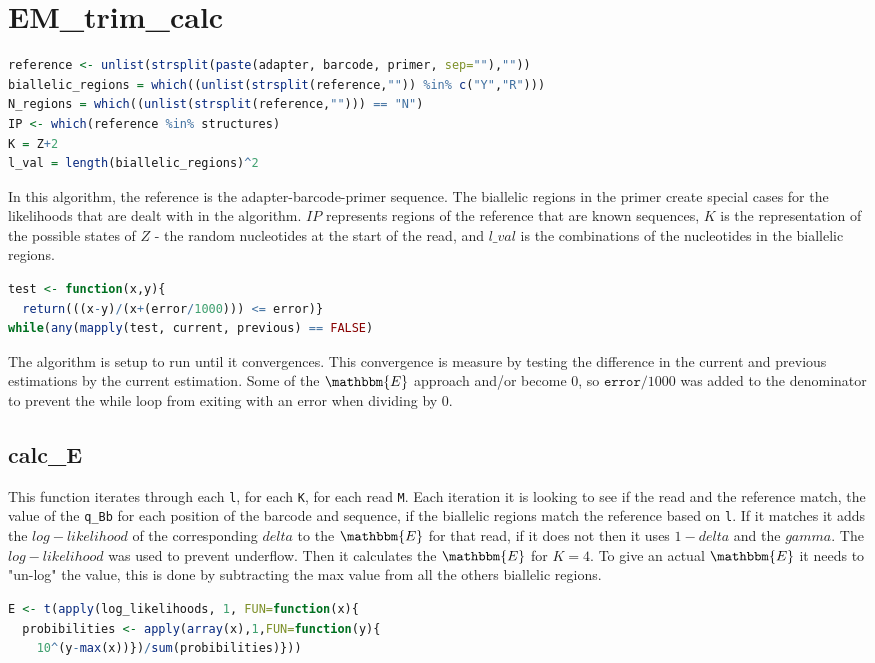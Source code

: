 \documentclass[12pt]{article}
\begin{document}
\section*{EM\_trim\_calc}
  \begin{lstlisting}[language=R]
reference <- unlist(strsplit(paste(adapter, barcode, primer, sep=""),""))
biallelic_regions = which((unlist(strsplit(reference,"")) %in% c("Y","R")))
N_regions = which((unlist(strsplit(reference,""))) == "N")
IP <- which(reference %in% structures)
K = Z+2
l_val = length(biallelic_regions)^2
  \end{lstlisting}
  In this algorithm, the reference is the adapter-barcode-primer sequence. The biallelic regions in the primer create special cases for the likelihoods that are dealt with in the algorithm. $IP$ represents regions of the reference that are known sequences, $K$ is the representation of the possible states of $Z$ - the random nucleotides at the start of the read, and $l\_val$ is the combinations of the nucleotides in the biallelic regions.
  \begin{lstlisting}[language=R]
test <- function(x,y){
  return(((x-y)/(x+(error/1000))) <= error)}
while(any(mapply(test, current, previous) == FALSE)
  \end{lstlisting}
The algorithm is setup to run until it convergences. This convergence is measure by testing the difference in the current and previous estimations by the current estimation. Some of the $\mathbbm{E}$ approach and/or become $0$, so ${\texttt{error}/1000}$ was added to the denominator to prevent the while loop from exiting with an error when dividing by $0$.\\
  \subsection*{calc\_E}
This function iterates through each \texttt{l}, for each \texttt{K}, for each read \texttt{M}. Each iteration it is looking to see if the read and the reference match, the value of the \texttt{q\_Bb} for each position of the barcode and sequence, if the biallelic regions match the reference based on \texttt{l}. If it matches it adds the $log-likelihood$ of the corresponding $delta$ to the $\mathbbm{E}$ for that read, if it does not then it uses $1-delta$ and the $gamma$. The $log-likelihood$ was used to prevent underflow. Then it calculates the $\mathbbm{E}$ for $K = 4$. To give an actual $\mathbbm{E}$ it needs to "un-log" the value, this is done by subtracting the max value from all the others 
biallelic regions.
  \begin{lstlisting}[language=R]
E <- t(apply(log_likelihoods, 1, FUN=function(x){
  probibilities <- apply(array(x),1,FUN=function(y){
    10^(y-max(x))})/sum(probibilities)}))
  \end{lstlisting}
\end{document}
